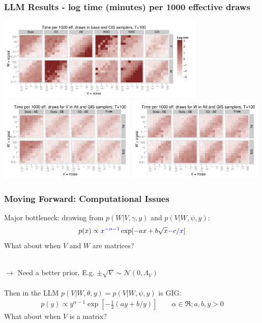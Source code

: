 \documentclass[xcolor=dvipsnames]{beamer}
\newcommand\N{\mathcal{N}}
\begin{document}
\begin{frame}
\frametitle{LLM Results - log time (minutes) per 1000 effective draws}
\centering
\includegraphics[width=0.75\textwidth]{basecistimeplot100}\\
\includegraphics[width=0.49\textwidth]{altgisVtimeplot100}
\includegraphics[width=0.49\textwidth]{altgisWtimeplot100}
\end{frame}

\begin{frame}
\frametitle{Moving Forward: Computational Issues}
Major bottleneck: drawing from $p(W|V,\gamma,y)$ and $p(V|W,\psi,y)$:
\begin{align*}
p(x)\propto {\color{blue}x^{-\alpha-1}}\exp[-ax + b\sqrt{x} {\color{blue}- c/x}] 
\end{align*}
What about when $V$ and $W$ are matrices?\\~

$\to$ Need a better prior. E.g. $\pm \sqrt{V} \sim \N(0,\Lambda_V)$\\~\\

Then in the LLM $p(V|W,\theta,y)=p(V|W,\psi,y)$ is GIG:
\begin{align*}
p(y) \propto y^{\alpha-1}\exp\left[-\frac{1}{2}(ay + b/y)\right] \qquad \alpha\in\Re; a,b,y>0
\end{align*}
What about when $V$ is a matrix?
\end{frame}
\end{document}
